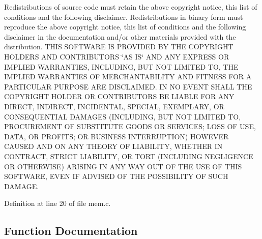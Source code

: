 Redistributions of source code must retain the above copyright notice, this list of conditions and the following disclaimer. Redistributions in binary form must reproduce the above copyright notice, this list of conditions and the following disclaimer in the documentation and/or other materials provided with the distribution. T\+H\+IS S\+O\+F\+T\+W\+A\+RE IS P\+R\+O\+V\+I\+D\+ED BY T\+HE C\+O\+P\+Y\+R\+I\+G\+HT H\+O\+L\+D\+E\+RS A\+ND C\+O\+N\+T\+R\+I\+B\+U\+T\+O\+RS \char`\"{}\+A\+S I\+S\char`\"{} A\+ND A\+NY E\+X\+P\+R\+E\+SS OR I\+M\+P\+L\+I\+ED W\+A\+R\+R\+A\+N\+T\+I\+ES, I\+N\+C\+L\+U\+D\+I\+NG, B\+UT N\+OT L\+I\+M\+I\+T\+ED TO, T\+HE I\+M\+P\+L\+I\+ED W\+A\+R\+R\+A\+N\+T\+I\+ES OF M\+E\+R\+C\+H\+A\+N\+T\+A\+B\+I\+L\+I\+TY A\+ND F\+I\+T\+N\+E\+SS F\+OR A P\+A\+R\+T\+I\+C\+U\+L\+AR P\+U\+R\+P\+O\+SE A\+RE D\+I\+S\+C\+L\+A\+I\+M\+ED. IN NO E\+V\+E\+NT S\+H\+A\+LL T\+HE C\+O\+P\+Y\+R\+I\+G\+HT H\+O\+L\+D\+ER OR C\+O\+N\+T\+R\+I\+B\+U\+T\+O\+RS BE L\+I\+A\+B\+LE F\+OR A\+NY D\+I\+R\+E\+CT, I\+N\+D\+I\+R\+E\+CT, I\+N\+C\+I\+D\+E\+N\+T\+AL, S\+P\+E\+C\+I\+AL, E\+X\+E\+M\+P\+L\+A\+RY, OR C\+O\+N\+S\+E\+Q\+U\+E\+N\+T\+I\+AL D\+A\+M\+A\+G\+ES (I\+N\+C\+L\+U\+D\+I\+NG, B\+UT N\+OT L\+I\+M\+I\+T\+ED TO, P\+R\+O\+C\+U\+R\+E\+M\+E\+NT OF S\+U\+B\+S\+T\+I\+T\+U\+TE G\+O\+O\+DS OR S\+E\+R\+V\+I\+C\+ES; L\+O\+SS OF U\+SE, D\+A\+TA, OR P\+R\+O\+F\+I\+TS; OR B\+U\+S\+I\+N\+E\+SS I\+N\+T\+E\+R\+R\+U\+P\+T\+I\+ON) H\+O\+W\+E\+V\+ER C\+A\+U\+S\+ED A\+ND ON A\+NY T\+H\+E\+O\+RY OF L\+I\+A\+B\+I\+L\+I\+TY, W\+H\+E\+T\+H\+ER IN C\+O\+N\+T\+R\+A\+CT, S\+T\+R\+I\+CT L\+I\+A\+B\+I\+L\+I\+TY, OR T\+O\+RT (I\+N\+C\+L\+U\+D\+I\+NG N\+E\+G\+L\+I\+G\+E\+N\+CE OR O\+T\+H\+E\+R\+W\+I\+SE) A\+R\+I\+S\+I\+NG IN A\+NY W\+AY O\+UT OF T\+HE U\+SE OF T\+H\+IS S\+O\+F\+T\+W\+A\+RE, E\+V\+EN IF A\+D\+V\+I\+S\+ED OF T\+HE P\+O\+S\+S\+I\+B\+I\+L\+I\+TY OF S\+U\+CH D\+A\+M\+A\+GE. 

Definition at line 20 of file mem.\+c.



\subsection{Function Documentation}
\mbox{\label{a00107_a9087e3504e5973deee6f3561705978c7_a9087e3504e5973deee6f3561705978c7}} 
